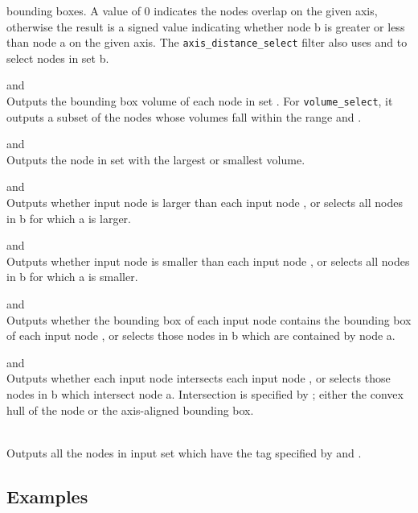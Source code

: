 \begin{description}
  bounding boxes. A value of 0 indicates the nodes overlap on the given axis, otherwise 
  the result is a signed value indicating whether node b is greater or less than 
  node a on the given axis.  
  The \texttt{axis\_distance\_select} filter also uses  and 
  to select nodes in set b. 
\item{ and } \\
  Outputs the bounding box volume of each node in set . 
  For \texttt{volume\_select}, it outputs a subset of the nodes whose volumes
  fall within the range  and .
\item{ and } \\
  Outputs the node in set  with the largest or smallest volume.
\item{ and }\\
  Outputs whether input node  is larger than each input node , 
  or selects all nodes in b for which a is larger. 
\item{ and }\\
  Outputs whether input node  is smaller than each input node , 
  or selects all nodes in b for which a is smaller. 
\item{ and } \\
  Outputs whether the bounding box of each input node  contains
  the bounding box of each input node , or selects those nodes
  in b which are contained by node a. 
\item{ and } \\
  Outputs whether each input node  intersects each input node , 
  or selects those nodes in b which intersect node a. Intersection is specified
  by ; either the convex hull of the node
  or the axis-aligned bounding box. 
  \item{} \\
    Outputs all the nodes in input set  which have the tag specified by 
     and . 
\end{description}

\subsection{Examples}

